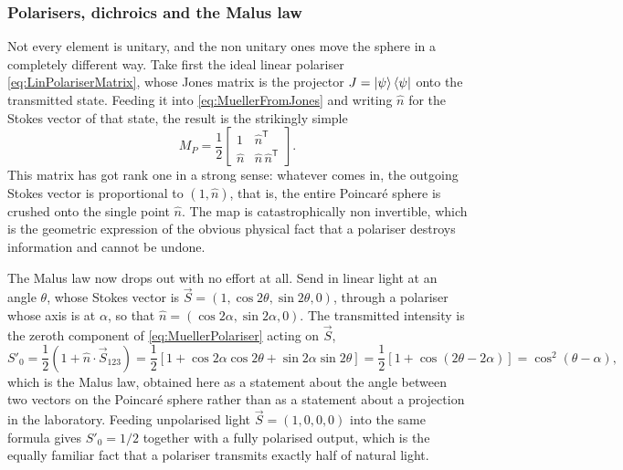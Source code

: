         \subsubsection{Polarisers, dichroics and the Malus law}

            Not every element is unitary, and the non unitary ones move the sphere in a completely different way. Take first the ideal linear polariser \ref{eq:LinPolariserMatrix}, whose Jones matrix is the projector $J=\ket{\psi}\bra{\psi}$ onto the transmitted state. Feeding it into \ref{eq:MuellerFromJones} and writing $\hat n$ for the Stokes vector of that state, the result is the strikingly simple
            \begin{equation}\label{eq:MuellerPolariser}
                M_P = \frac{1}{2}\begin{bmatrix} 1 & \hat n^{\mathsf{T}} \\ \hat n & \hat n\,\hat n^{\mathsf{T}}\end{bmatrix}.
            \end{equation}
            This matrix has got rank one in a strong sense: whatever comes in, the outgoing Stokes vector is proportional to $(1,\hat n)$, that is, the entire Poincaré sphere is crushed onto the single point $\hat n$. The map is catastrophically non invertible, which is the geometric expression of the obvious physical fact that a polariser destroys information and cannot be undone.

            The Malus law now drops out with no effort at all. Send in linear light at an angle $\theta$, whose Stokes vector is $\vec S=(1,\cos2\theta,\sin2\theta,0)$, through a polariser whose axis is at $\alpha$, so that $\hat n=(\cos2\alpha,\sin2\alpha,0)$. The transmitted intensity is the zeroth component of \ref{eq:MuellerPolariser} acting on $\vec S$,
            \begin{equation*}
                S'_0 = \frac{1}{2}\left(1+\hat n\cdot\vec{S}_{123}\right) = \frac{1}{2}\left[1+\cos2\alpha\cos2\theta+\sin2\alpha\sin2\theta\right] = \frac{1}{2}\left[1+\cos\left(2\theta-2\alpha\right)\right] = \cos^2\left(\theta-\alpha\right),
            \end{equation*}
            which is the Malus law, obtained here as a statement about the angle between two vectors on the Poincaré sphere rather than as a statement about a projection in the laboratory. Feeding unpolarised light $\vec S=(1,0,0,0)$ into the same formula gives $S'_0=1/2$ together with a fully polarised output, which is the equally familiar fact that a polariser transmits exactly half of natural light.

